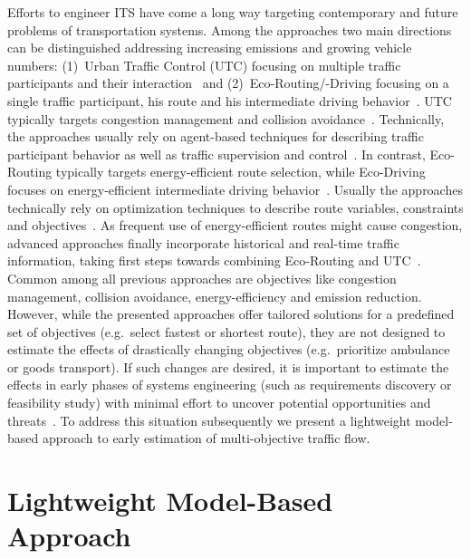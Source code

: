 \documentclass[conference]{../cls/IEEEtran}
\begin{document}
Efforts to engineer ITS have come a long way targeting contemporary and future
problems of transportation systems. Among the approaches two main directions can
be distinguished addressing increasing emissions and growing vehicle numbers:
(1)~Urban Traffic Control (UTC) focusing on multiple traffic participants and
their interaction~\cite{Chen2010} and (2)~Eco-Routing/-Driving focusing
on a single traffic participant, his route and his intermediate driving
behavior~\cite{Ericsson2006,Boriboonsomsin2012}. UTC typically targets
congestion management and collision avoidance~\cite{Chen2010}. Technically, the
approaches usually rely on agent-based techniques for describing traffic
participant behavior as well as traffic supervision and control~\cite{Chen2010}.
In contrast, Eco-Routing typically targets energy-efficient route selection,
while Eco-Driving focuses on energy-efficient intermediate driving
behavior~\cite{Ericsson2006}. Usually the approaches technically rely
on optimization techniques to describe route variables, constraints and
objectives~\cite{Ericsson2006}. As frequent use of energy-efficient routes might
cause congestion, advanced approaches finally incorporate historical and
real-time traffic information, taking first steps towards combining
Eco-Routing and UTC~\cite{Boriboonsomsin2012}. 
Common among all previous approaches are objectives like congestion management,
collision avoidance, energy-efficiency and emission reduction. 
However, while the presented approaches offer tailored solutions for a
predefined set of objectives (e.g.\ select fastest or shortest route), they are not designed to
estimate the effects of drastically changing objectives (e.g.\ prioritize
ambulance or goods transport). 
If such changes are desired, it is important to
estimate the effects in early phases of systems engineering (such as
requirements discovery or feasibility study) with minimal effort to uncover
potential opportunities and threats~\cite{Whitten2005}. To address this
situation subsequently we present a lightweight model-based approach to early
estimation of multi-objective traffic flow.

\section{Lightweight Model-Based Approach}
\label{sec:approach}
\end{document}
